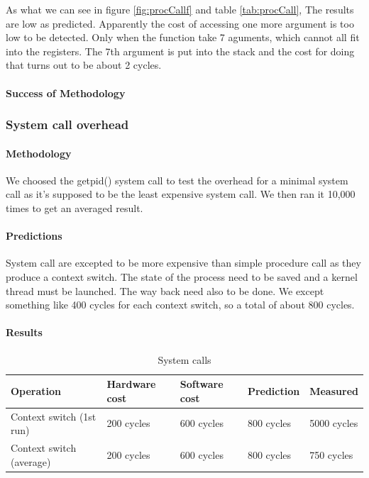 As what we can see in figure \ref{fig:procCallf} and table \ref{tab:procCall}, The results are low as predicted. Apparently the cost of accessing one more argument is too low to be detected. Only when the function take 7 aguments, which cannot all fit into the registers. The 7th argument is put into the stack and the cost for doing that turns out to be about 2 cycles.

\paragraph{Success of Methodology}







\subsubsection{System call overhead}
\paragraph{Methodology}
We choosed the getpid() system call to test the overhead for a minimal system
call as it's supposed to be the least expensive system call.
We then ran it 10,000 times to get an averaged result.

\paragraph{Predictions}
System call are excepted to be more expensive than simple procedure call as they
produce a context switch.
The state of the process need to be saved and a kernel thread must be launched.
The way back need also to be done.
We except something like 400 cycles for each context switch, so a total of about 800 cycles.

\paragraph{Results}
\begin{table} [h]
\begin{center}
\begin{tabular}{| l | l | l | l | l |}
\hline
Operation & Hardware cost & Software cost & Prediction & Measured \\
\hline
Context switch (1st run) & 200 cycles & 600 cycles & 800 cycles & 5000 cycles\\
\hline
Context switch (average) & 200 cycles & 600 cycles & 800 cycles & 750 cycles\\
\hline
\end{tabular}
\end{center}

\caption{System calls\label {tab:sysCall}}
\end{table}

